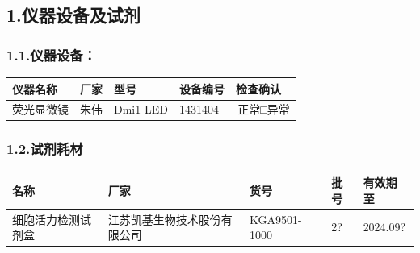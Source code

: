 \documentclass[UTF8,10pt,a4paper,fontset=fandol]{ctexart}
\newcommand{\fieldvalue}[1]{#1}
\newcommand{\handwritten}[1]{#1}
\begin{document}
\subsection*{1.\quad 仪器设备及试剂}

\subsubsection*{1.1.\quad 仪器设备：}

\begin{tabularx}{\textwidth}{|>{\centering\arraybackslash}X|>{\centering\arraybackslash}X|>{\centering\arraybackslash}X|>{\centering\arraybackslash}X|>{\centering\arraybackslash}X|}
\hline
仪器名称 & 厂家 & 型号 & 设备编号 & 检查确认\\
\hline
\fieldvalue{荧光显微镜} &
\fieldvalue{朱伟} &
\fieldvalue{Dmi1 LED} &
\fieldvalue{1431404} &
\fieldvalue{\handwritten{\checkmark}\,正常\quad□异常}\\
\hline
\end{tabularx}

\subsubsection*{1.2.\quad 试剂耗材}

\begin{tabularx}{\textwidth}{|>{\centering\arraybackslash}X|>{\centering\arraybackslash}X|>{\centering\arraybackslash}X|>{\centering\arraybackslash}X|>{\centering\arraybackslash}X|}
\hline
名称 & 厂家 & 货号 & 批号 & 有效期至\\
\hline
\fieldvalue{细胞活力检测试剂盒} &
\fieldvalue{江苏凯基生物技术股份有限公司} &
\fieldvalue{KGA9501-1000} &
\fieldvalue{\handwritten{2?}} &
\fieldvalue{\handwritten{2024.09?}}\\
\hline
\end{tabularx}
\end{document}
